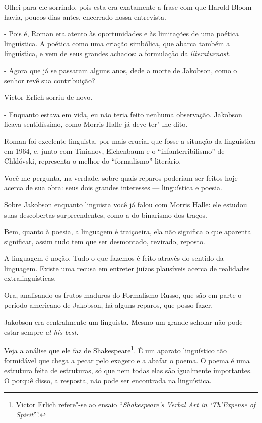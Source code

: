 Olhei para ele sorrindo, pois esta era exatamente a frase com que Harold
Bloom havia, poucos dias antes, encerrado nossa entrevista.

- Pois é, Roman era atento às oportunidades e às limitações de uma
poética linguística. A poética como uma criação simbólica, que abarca
também a linguística, e vem de seus grandes achados: a formulação da
\emph{literaturnost}.

- Agora que já se passaram alguns anos, dede a morte de Jakobson, como o
senhor revê sua contribuição?

Victor Erlich sorriu de novo.

- Enquanto estava em vida, eu não teria feito nenhuma observação.
Jakobson ficava sentidíssimo, como Morris Halle já deve ter"-lhe dito.

Roman foi excelente linguista, por mais crucial que fosse a situação da
linguística em 1964, e, junto com Tinianov, Eichenbaum e o
``infanterribilismo'' de Chklóvski, representa o melhor do
``formalismo'' literário.

Você me pergunta, na verdade, sobre quais reparos poderiam ser feitos
hoje acerca de sua obra: seus dois grandes interesses --- linguística e
poesia.

Sobre Jakobson enquanto linguista você já falou com Morris Halle: ele
estudou suas descobertas surpreendentes, como a do binarismo dos traços.

Bem, quanto à poesia, a linguagem é traiçoeira, ela não significa o que
aparenta significar, assim tudo tem que ser desmontado, revirado,
reposto.

A linguagem é noção. Tudo o que fazemos é feito através do sentido da
linguagem. Existe uma recusa em entreter juízos plausíveis acerca de
realidades extralinguísticas.

Ora, analisando os frutos maduros do Formalismo Russo, que são em parte
o período americano de Jakobson, há alguns reparos, que posso fazer.

Jakobson era centralmente um linguista. Mesmo um grande scholar não pode
estar sempre \emph{at his best}.

Veja a análise que ele faz de Shakespeare\footnote{Victor Erlich
  refere"-se ao ensaio ``\emph{Shakespeare's Verbal Art in `Th'Expense of
  Spirit}'''.}. É um aparato linguístico tão formidável que chega a
pecar pelo exagero e a abafar o poema. O poema é uma estrutura feita de
estruturas, só que nem todas elas são igualmente importantes. O porquê
disso, a resposta, não pode ser encontrada na linguística.

